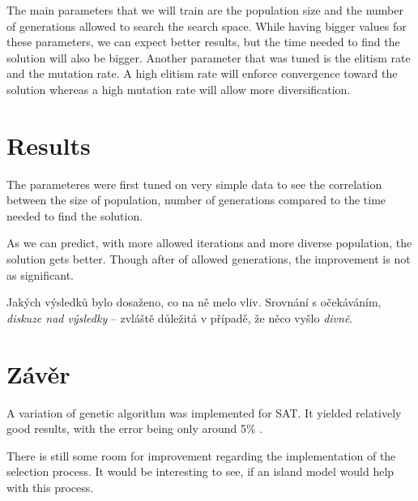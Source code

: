 \documentclass[czech]{mvi-report}
\begin{document}
The main parameters that we will train are the population size and the number of generations allowed to search the search space. While having bigger values for these parameters, we can expect better results, but the time needed to find the solution will also be bigger.
Another parameter that was tuned is the elitism rate and the mutation rate. A high elitism rate will enforce convergence toward the solution whereas a high mutation rate will allow more diversification.

\section{Results}

The parameteres were first tuned on very simple data to see the correlation between the size of population, number of generations compared to the time needed to find the solution.

As we can predict, with more allowed iterations and more diverse population, the solution gets better. Though after  of allowed generations, the improvement is not as significant.


Jakých výsledků bylo dosaženo, co na ně melo vliv. Srovnání s očekáváním, \emph{diskuze nad výsledky} -- zvláště důležitá v případě, že něco vyšlo \emph{divně}.




\section{Závěr}
A variation of genetic algorithm was implemented for SAT. It yielded relatively good results, with the error being only around 5\% . 

There is still some room for improvement regarding the implementation of the selection process. It would be interesting to see, if an island model would help with this process. 

%

\end{document}
